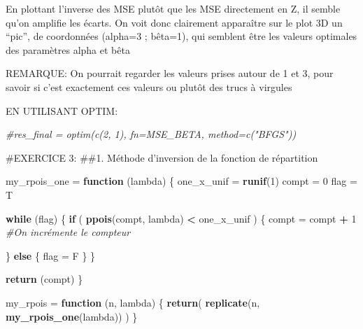 \documentclass[]{article}
\newenvironment{Shaded}{\begin{snugshade}}{\end{snugshade}}
\newcommand{\CommentTok}[1]{\textcolor[rgb]{0.56,0.35,0.01}{\textit{#1}}}
\newcommand{\ControlFlowTok}[1]{\textcolor[rgb]{0.13,0.29,0.53}{\textbf{#1}}}
\newcommand{\DecValTok}[1]{\textcolor[rgb]{0.00,0.00,0.81}{#1}}
\newcommand{\KeywordTok}[1]{\textcolor[rgb]{0.13,0.29,0.53}{\textbf{#1}}}
\newcommand{\NormalTok}[1]{#1}
\newcommand{\OperatorTok}[1]{\textcolor[rgb]{0.81,0.36,0.00}{\textbf{#1}}}
\newcommand{\StringTok}[1]{\textcolor[rgb]{0.31,0.60,0.02}{#1}}
\begin{document}
En plottant l'inverse des MSE plutôt que les MSE directement en Z, il
semble qu'on amplifie les écarts. On voit donc clairement apparaître sur
le plot 3D un ``pic'', de coordonnées (alpha=3 ; bêta=1), qui semblent
être les valeurs optimales des paramètres alpha et bêta

REMARQUE: On pourrait regarder les valeurs prises autour de 1 et 3, pour
savoir si c'est exactement ces valeurs ou plutôt des trucs à virgules

EN UTILISANT OPTIM:

\begin{Shaded}
\begin{Highlighting}[]
\CommentTok{#res_final = optim(c(2, 1), fn=MSE_BETA, method=c("BFGS"))}
\end{Highlighting}
\end{Shaded}

\#EXERCICE 3: \#\#1. Méthode d'inversion de la fonction de répartition

\begin{Shaded}
\begin{Highlighting}[]
\NormalTok{my_rpois_one =}\StringTok{ }\ControlFlowTok{function}\NormalTok{ (lambda)}
\NormalTok{\{}
\NormalTok{  one_x_unif =}\StringTok{ }\KeywordTok{runif}\NormalTok{(}\DecValTok{1}\NormalTok{)}
\NormalTok{  compt =}\StringTok{ }\DecValTok{0}
\NormalTok{  flag =}\StringTok{ }\NormalTok{T}
  
  \ControlFlowTok{while}\NormalTok{ (flag)}
\NormalTok{  \{}
    \ControlFlowTok{if}\NormalTok{ ( }\KeywordTok{ppois}\NormalTok{(compt, lambda) }\OperatorTok{<}\StringTok{ }\NormalTok{one_x_unif )}
\NormalTok{    \{}
\NormalTok{      compt =}\StringTok{ }\NormalTok{compt }\OperatorTok{+}\StringTok{ }\DecValTok{1} \CommentTok{#On incrémente le compteur}
      
\NormalTok{    \} }\ControlFlowTok{else}\NormalTok{ \{ flag =}\StringTok{ }\NormalTok{F \}}
\NormalTok{  \} }
  
  \KeywordTok{return}\NormalTok{ (compt)    }
\NormalTok{\}}

\NormalTok{my_rpois =}\StringTok{ }\ControlFlowTok{function}\NormalTok{ (n, lambda)}
\NormalTok{\{}
  \KeywordTok{return}\NormalTok{( }\KeywordTok{replicate}\NormalTok{(n, }\KeywordTok{my_rpois_one}\NormalTok{(lambda)) )}
\NormalTok{\}}
\end{Highlighting}
\end{Shaded}
\end{document}
